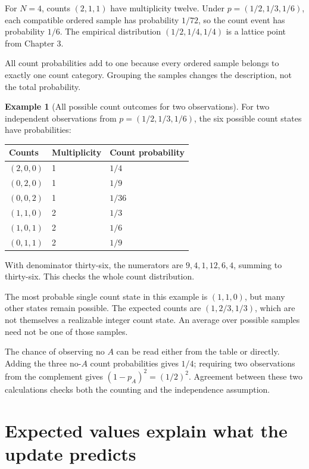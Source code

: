 \documentclass[11pt,oneside,openany]{book}
\theoremstyle{definition}
\newtheorem{example}{Example}[chapter]
\theoremstyle{remark}
\numberwithin{equation}{chapter}
\begin{document}
For \(N=4\), counts \((2,1,1)\) have multiplicity twelve. Under \(p=(1/2,1/3,1/6)\), each compatible ordered sample has probability \(1/72\), so the count event has probability \(1/6\). The empirical distribution \((1/2,1/4,1/4)\) is a lattice point from Chapter 3.

All count probabilities add to one because every ordered sample belongs to exactly one count category. Grouping the samples changes the description, not the total probability.

\begin{example}[All possible count outcomes for two observations]

For two independent observations from \(p=(1/2,1/3,1/6)\), the six possible count states have probabilities:

\begin{longtable}[]{@{}lll@{}}
\toprule\noalign{}
Counts & Multiplicity & Count probability \\
\midrule\noalign{}
\endhead
\bottomrule\noalign{}
\endlastfoot
\((2,0,0)\) & 1 & \(1/4\) \\
\((0,2,0)\) & 1 & \(1/9\) \\
\((0,0,2)\) & 1 & \(1/36\) \\
\((1,1,0)\) & 2 & \(1/3\) \\
\((1,0,1)\) & 2 & \(1/6\) \\
\((0,1,1)\) & 2 & \(1/9\) \\
\end{longtable}

With denominator thirty-six, the numerators are \(9,4,1,12,6,4\), summing to thirty-six. This checks the whole count distribution.

\end{example}

The most probable single count state in this example is \((1,1,0)\), but many other states remain possible. The expected counts are \((1,2/3,1/3)\), which are not themselves a realizable integer count state. An average over possible samples need not be one of those samples.

The chance of observing no \(A\) can be read either from the table or directly. Adding the three no-\(A\) count probabilities gives \(1/4\); requiring two observations from the complement gives \((1-p_A)^2=(1/2)^2\). Agreement between these two calculations checks both the counting and the independence assumption.

\section{Expected values explain what the update predicts}\label{ch04-expected-values-explain-what-the-update-predicts}
\end{document}
